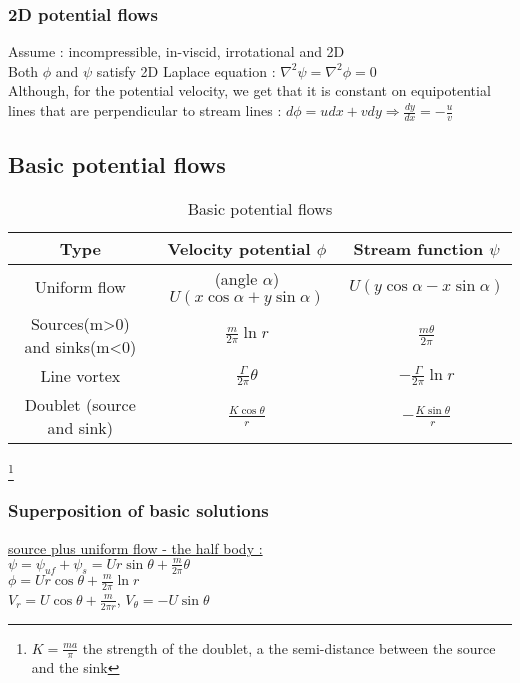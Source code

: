 \documentclass[../main.tex]{subfiles}
\begin{document}
\subsubsection{2D potential flows}
Assume : incompressible, in-viscid, irrotational and 2D\\

Both $\phi$ and $\psi$ satisfy 2D Laplace equation : $\nabla^2 \psi = \nabla^2 \phi = 0$\\

Although, for the potential velocity, we get that it is constant on equipotential lines that are perpendicular to stream lines : $d\phi = udx+vdy \Rightarrow \frac{dy}{dx} = -\frac{u}{v}$\\

\subsection{Basic potential flows}
\begin{table}[hbt!]
    \centering
    \begin{tabular}{||c|c|c|}
    \hline
        Type & Velocity potential $\phi$ & Stream function $\psi$\\
        \hline
        Uniform flow & (angle $\alpha$) $U(x \cos{\alpha} + y \sin{\alpha})$ & $U(y \cos{\alpha} - x \sin{\alpha})$\\
        Sources(m>0) and sinks(m<0) & $\frac{m}{2\pi} \ln{r}$ & $\frac{m \theta}{2\pi}$\\
        Line vortex & $\frac{\Gamma}{2\pi} \theta$ & $-\frac{\Gamma}{2\pi} \ln{r}$\\
        Doublet (source and sink)& $\frac{K \cos{\theta}}{r}$ & $-\frac{K \sin{\theta}}{r}$\\
        \hline
    \end{tabular}
    \caption{Basic potential flows}
\end{table}
\footnote{$K = \frac{ma}{\pi}$ the strength of the doublet, a the semi-distance between the source and the sink} 
\subsubsection{Superposition of basic solutions}
\quad \underline{source plus uniform flow - the half body :}\\
$\psi = \psi_{uf} + \psi_s = Ur\sin{\theta} + \frac{m}{2\pi}\theta$\\
$\phi = U r\cos{\theta} + \frac{m}{2\pi}\ln{r}$\\
$V_r = U \cos{\theta} + \frac{m}{2\pi r}$, $V_\theta = -U \sin{\theta}$\\
\end{document}
